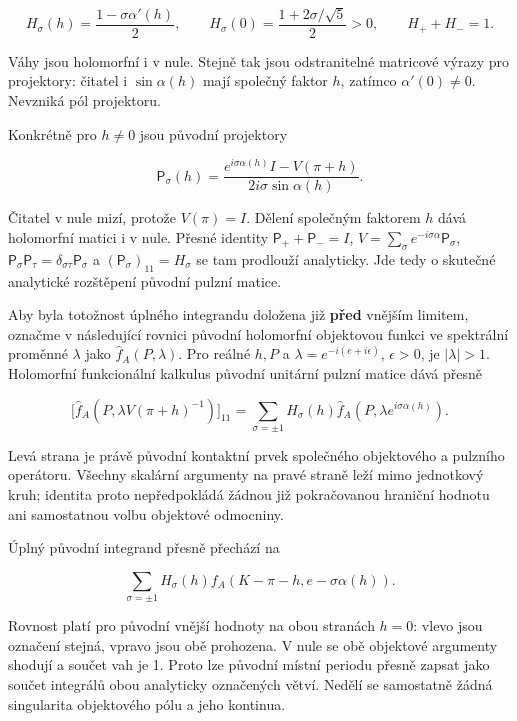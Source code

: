\documentclass[11pt,a4paper]{article}
\theoremstyle{remark}\newtheorem{remark}[theorem]{Poznámka}
\numberwithin{equation}{section}
\begin{document}
\[
H_\sigma(h)=\frac{1-\sigma\alpha'(h)}2,
\qquad H_\sigma(0)=\frac{1+2\sigma/\sqrt5}{2}>0,
\qquad H_++H_-=1.
\tag{KP15}
\]

Váhy jsou holomorfní i v nule. Stejně tak jsou odstranitelné matricové
výrazy pro projektory: čitatel i \(\sin\alpha(h)\) mají společný faktor
\(h\), zatímco \(\alpha'(0)\ne0\). Nevzniká pól projektoru.

Konkrétně pro \(h\ne0\) jsou původní projektory

\[
\mathsf P_\sigma(h)=
\frac{e^{i\sigma\alpha(h)}I-V(\pi+h)}
{2i\sigma\sin\alpha(h)}.
\tag{KP15a}
\]

Čitatel v nule mizí, protože \(V(\pi)=I\). Dělení společným faktorem
\(h\) dává holomorfní matici i v nule. Přesné identity
\(\mathsf P_++\mathsf P_-=I\),
\(V=\sum_\sigma e^{-i\sigma\alpha}\mathsf P_\sigma\),
\(\mathsf P_\sigma\mathsf P_\tau=\delta_{\sigma\tau} \mathsf P_\sigma\)
a \((\mathsf P_\sigma)_{11}=H_\sigma\) se tam prodlouží analyticky. Jde
tedy o skutečné analytické rozštěpení původní pulzní matice.

Aby byla totožnost úplného integrandu doložena již \textbf{před} vnějším
limitem, označme v následující rovnici původní holomorfní objektovou
funkci ve spektrální proměnné \(\lambda\) jako
\(\widehat f_A(P,\lambda)\). Pro reálné \(h,P\) a
\(\lambda=e^{-i(e+i\epsilon)}\), \(\epsilon>0\), je \(|\lambda|>1\).
Holomorfní funkcionální kalkulus původní unitární pulzní matice dává
přesně

\[
\boxed{
\bigl[\widehat f_A(P,\lambda V(\pi+h)^{-1})\bigr]_{11}
=\sum_{\sigma=\pm1}H_\sigma(h)
\widehat f_A(P,\lambda e^{i\sigma\alpha(h)}).
}
\tag{KP15b}
\]

Levá strana je právě původní kontaktní prvek společného objektového a
pulzního operátoru. Všechny skalární argumenty na pravé straně leží mimo
jednotkový kruh; identita proto nepředpokládá žádnou již pokračovanou
hraniční hodnotu ani samostatnou volbu objektové odmocniny.

Úplný původní integrand přesně přechází na

\[
\boxed{
\sum_{\sigma=\pm1}H_\sigma(h)
f_A(K-\pi-h,e-\sigma\alpha(h)).
}
\tag{KP16}
\]

Rovnost platí pro původní vnější hodnoty na obou stranách \(h=0\): vlevo
jsou označení stejná, vpravo jsou obě prohozena. V nule se obě objektové
argumenty shodují a součet vah je 1. Proto lze původní místní periodu
přesně zapsat jako součet integrálů obou analyticky označených větví.
Nedělí se samostatně žádná singularita objektového pólu a jeho kontinua.
\end{document}
